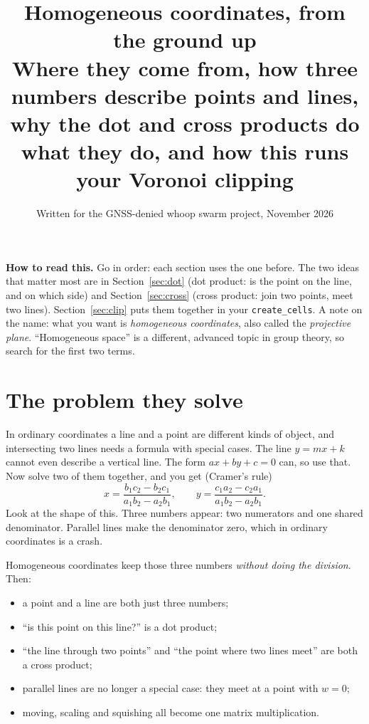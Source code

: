\documentclass[11pt,a4paper]{article}
\title{\textbf{Homogeneous coordinates, from the ground up}\\[3pt]
\large Where they come from, how three numbers describe points and lines,\\
why the dot and cross products do what they do, and how this runs your Voronoi clipping}
\date{Written for the GNSS-denied whoop swarm project, November 2026}
\begin{document}
\maketitle
\vspace{-1em}
\begin{center}
\begin{minipage}{0.9\textwidth}\small
\textbf{How to read this.} Go in order: each section uses the one before. The two ideas that matter most are in
Section~\ref{sec:dot} (dot product: is the point on the line, and on which side) and Section~\ref{sec:cross} (cross
product: join two points, meet two lines). Section~\ref{sec:clip} puts them together in your \texttt{create\_cells}.
A note on the name: what you want is \emph{homogeneous coordinates}, also called the \emph{projective plane}.
``Homogeneous space'' is a different, advanced topic in group theory, so search for the first two terms.
\end{minipage}
\end{center}

\tableofcontents

\section{The problem they solve}

In ordinary coordinates a line and a point are different kinds of object, and intersecting two lines needs a formula
with special cases. The line $y=mx+k$ cannot even describe a vertical line. The form $ax+by+c=0$ can, so use that.
Now solve two of them together, and you get (Cramer's rule)
\[
x=\frac{b_1c_2-b_2c_1}{a_1b_2-a_2b_1},\qquad y=\frac{c_1a_2-c_2a_1}{a_1b_2-a_2b_1}.
\]
Look at the shape of this. Three numbers appear: two numerators and one shared denominator. Parallel lines make the
denominator zero, which in ordinary coordinates is a crash.

Homogeneous coordinates keep those three numbers \emph{without doing the division}. Then:
\begin{itemize}
\item a point and a line are both just three numbers;
\item ``is this point on this line?'' is a dot product;
\item ``the line through two points'' and ``the point where two lines meet'' are both a cross product;
\item parallel lines are no longer a special case: they meet at a point with $w=0$;
\item moving, scaling and squishing all become one matrix multiplication.
\end{itemize}
\end{document}
